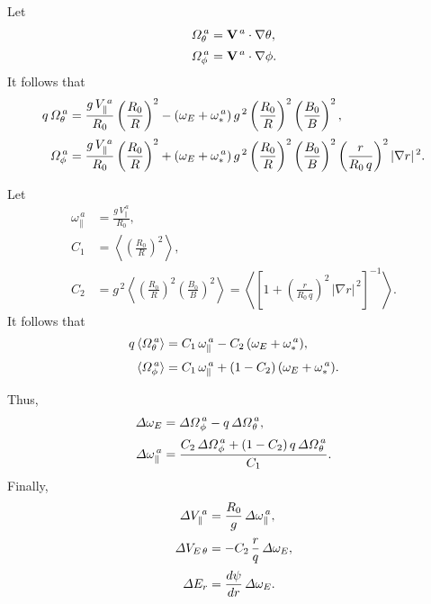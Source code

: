 \documentclass[notitlepage,12pt]{article}
\begin{document}
Let
\begin{align}
{\mit\Omega}_\theta^{\,a} &= {\bf V}^{\,a}\cdot\nabla\theta,\\[0.5ex]
{\mit\Omega}_\phi^{\,a} &= {\bf V}^{\,a}\cdot\nabla\phi.
\end{align}
It follows that
\begin{align}
q\,{\mit\Omega}_\theta^{\,a}& = \frac{g\,V_\parallel^{\,a}}{R_0}\left(\frac{R_0}{R}\right)^2- (\omega_E+\omega_{\ast}^{\,a})\,g^{\,2}
\left(\frac{R_0}{R}\right)^2\left(\frac{B_0}{B}\right)^2,\\[0.5ex]
{\mit\Omega}_\phi^{\,a}& = \frac{g\,V_\parallel^{\,a}}{R_0}\left(\frac{R_0}{R}\right)^2+ (\omega_E+\omega_{\ast}^{\,a})\,g^{\,2}
\left(\frac{R_0}{R}\right)^2\left(\frac{B_0}{B}\right)^2\left(\frac{r}{R_0\,q}\right)^2|\nabla r|^{\,2}.
\end{align}

Let 
\begin{align}
\omega_{\parallel}^{\,a} &= \frac{g\,V_\parallel^{\,a}}{R_0},\\[0.5ex]
C_1 &= \left\langle \left(\frac{R_0}{R}\right)^2\right\rangle,\\[0.5ex]
C_2 &= g^{\,2} \left\langle \left(\frac{R_0}{R}\right)^2\left(\frac{B_0}{B}\right)^2\right\rangle=\left\langle
\left[1+\left(\frac{r}{R_0\,q}\right)^2\,|\nabla r|^{\,2}\right]^{-1}\right\rangle.
\end{align}
It follows that
\begin{align}
q\,\langle{\mit\Omega}_\theta^{\,a}\rangle &= C_1\,\omega_\parallel^{\,a}- C_2\,(\omega_E+\omega_\ast^{\,a}),\\[0.5ex]
\langle{\mit\Omega}_\phi^{\,a}\rangle &= C_1\,\omega_\parallel^{\,a} +(1- C_2)\,(\omega_E+\omega_\ast^{\,a}).
\end{align}

Thus,
\begin{align}
{\mit\Delta}\omega_E &= {\mit\Delta\Omega}_\phi^{\,a}-q\,{\mit\Delta\Omega}_\theta^{\,a},\\[0.5ex]
{\mit\Delta}\omega_\parallel^{\,a} &= \frac{C_2\,{\mit\Delta\Omega}_\phi^{\,a} + (1-C_2)\,q\,{\mit\Delta\Omega}_\theta^{\,a}}{C_1}.
\end{align}
Finally,
\begin{align}
{\mit\Delta}V_{\parallel}^{\,a} &=\frac{R_0}{g}\,{\mit\Delta}\omega_\parallel^{\,a},\\[0.5ex]
{\mit\Delta}V_{E\,\theta} &= - C_2\,\frac{r}{q}\,{\mit\Delta}\omega_E,\\[0.5ex]
{\mit\Delta}E_r &= \frac{d\psi}{dr}\,{\mit\Delta}\omega_E.
\end{align}
\end{document}
